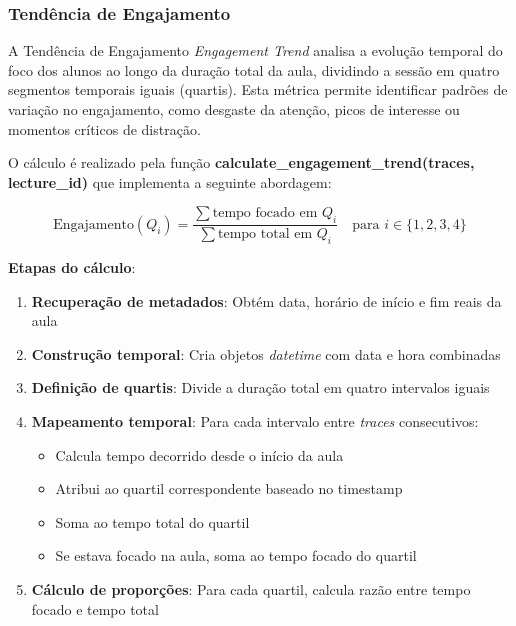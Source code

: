 \subsubsection{Tendência de Engajamento}
A Tendência de Engajamento \textit{Engagement Trend} analisa a evolução temporal do foco dos alunos ao longo da duração total da aula, dividindo a sessão em quatro segmentos temporais iguais (quartis). Esta métrica permite identificar padrões de variação no engajamento, como desgaste da atenção, picos de interesse ou momentos críticos de distração.

O cálculo é realizado pela função \textbf{calculate\_engagement\_trend(traces, lecture\_id)} que implementa a seguinte abordagem:

\begin{equation}
\text{Engajamento}(Q_i) = \frac{\sum \text{tempo focado em } Q_i}{\sum \text{tempo total em } Q_i} \quad \text{para } i \in \{1,2,3,4\}
\end{equation}

% 

\textbf{Etapas do cálculo}:
\begin{enumerate}
    \item \textbf{Recuperação de metadados}: Obtém data, horário de início e fim reais da aula
    \item \textbf{Construção temporal}: Cria objetos \textit{datetime} com data e hora combinadas
    \item \textbf{Definição de quartis}: Divide a duração total em quatro intervalos iguais
    \item \textbf{Mapeamento temporal}: Para cada intervalo entre \textit{traces} consecutivos:
    \begin{itemize}
        \item Calcula tempo decorrido desde o início da aula
        \item Atribui ao quartil correspondente baseado no timestamp
        \item Soma ao tempo total do quartil
        \item Se estava focado na aula, soma ao tempo focado do quartil
    \end{itemize}
    \item \textbf{Cálculo de proporções}: Para cada quartil, calcula razão entre tempo focado e tempo total
\end{enumerate}

